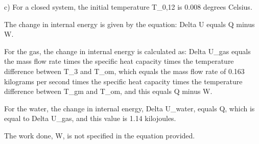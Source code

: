 c) For a closed system, the initial temperature T_0,12 is 0.008 degrees Celsius.

The change in internal energy is given by the equation:
Delta U equals Q minus W.

For the gas, the change in internal energy is calculated as:
Delta U_gas equals the mass flow rate times the specific heat capacity times the temperature difference between T_3 and T_om, which equals the mass flow rate of 0.163 kilograms per second times the specific heat capacity times the temperature difference between T_gm and T_om, and this equals Q minus W.

For the water, the change in internal energy, Delta U_water, equals Q, which is equal to Delta U_gas, and this value is 1.14 kilojoules.

The work done, W, is not specified in the equation provided.